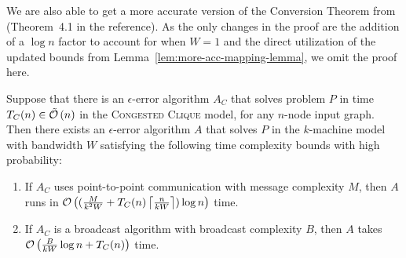 We are also able to get a more accurate version of the Conversion Theorem from~\cite{KlauckNPR15} (Theorem~4.1 in the reference). As the only changes in the proof are the addition of a \(\log{n}\) factor to account for when \(W=1\) and the direct utilization of the updated bounds from Lemma~\ref{lem:more-acc-mapping-lemma},
 we omit the proof here.

\begin{theorem}
    \label{thm:more-acc-conversion-theorem}
Suppose that there is an \(\epsilon\)-error algorithm \(A_C\) that solves problem \(P\) in time \(T_C(n) \in \tilde{\mathcal{O}}\left(n\right)\) in the \textsc{Congested Clique} model, for any \(n\)-node input graph. Then there exists an \(\epsilon\)-error algorithm \(A\) that solves \(P\) in the \(k\)-machine model with bandwidth \(W\) satisfying the following time complexity bounds with high probability:
\begin{enumerate}
    \item If \(A_C\) uses point-to-point communication with message complexity \(M\), then \(A\) runs in \(\mathcal{O}\left((\frac{M}{k^2 W} + T_C(n)\left\lceil\frac{n}{kW}\right\rceil) \log n\right)\) time.
    \item If \(A_C\) is a broadcast algorithm with broadcast complexity \(B\), then \(A\) takes \(\mathcal{O}\left(\frac{B}{kW} \log n + T_C(n)\right)\) time.
\end{enumerate}
\end{theorem}
